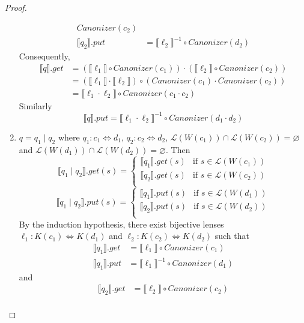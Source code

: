 \documentclass{svproc}
\newcommand{\sep}{\ensuremath{\; | \;}}
\newcommand{\canonizer}{\ensuremath{\mathit{Canonizer}}}
\begin{document}
\begin{proof}
\begin{enumerate}
\begin{align*}
\canonizer(c_2)\\
\llbracket q_2 \rrbracket.put &= {\llbracket \ell_2 \rrbracket}^{-1} \circ
\canonizer(d_2)
\end{align*}
Consequently,
\begin{align*}
  \llbracket q \rrbracket.get &= (\llbracket \ell_1 \rrbracket \circ
\canonizer(c_1)) \cdot  (\llbracket \ell_2 \rrbracket \circ
\canonizer(c_2))\\
&= (\llbracket \ell_1 \rrbracket \cdot \llbracket \ell_2
\rrbracket) \circ (\canonizer(c_1) \cdot \canonizer(c_2))\\
&= \llbracket \ell_1 \cdot  \ell_2 \rrbracket \circ \canonizer(c_1 \cdot c_2)
\end{align*}
Similarly
$$
  \llbracket q \rrbracket.put = \llbracket \ell_1 \cdot  \ell_2 \rrbracket^{-1}
  \circ \canonizer(d_1 \cdot d_2) $$
  \item
  $q = q_1 \sep q_2$ where $q_1 : c_1 \Leftrightarrow d_1 $, $q_2 : c_2
  \Leftrightarrow d_2$, $\mathcal{L}(W(c_1)) \cap \mathcal{L}(W(c_2)) =
  \varnothing$ and $\mathcal{L}(W(d_1)) \cap \mathcal{L}(W(d_2)) = \varnothing$.
  Then
  $$
  \llbracket q_1 \sep q_2 \rrbracket.get(s) = 
  \begin{cases}
  \llbracket q_1 \rrbracket.get (s) & \text{if } s \in \mathcal{L}(W(c_1))\\
  \llbracket q_2 \rrbracket.get (s) & \text{if } s \in \mathcal{L}(W(c_2))\\
  \end{cases}$$
  $$\llbracket q_1 \sep q_2 \rrbracket.put(s) = 
  \begin{cases}
  \llbracket q_1 \rrbracket.put (s) & \text{if } s \in \mathcal{L}(W(d_1))\\
  \llbracket q_2 \rrbracket.put (s) & \text{if } s \in \mathcal{L}(W(d_2))\\
  \end{cases}
  $$
By the induction hypothesis, there exist bijective lenses $\ell_1 : K(c_1)
\Leftrightarrow K(d_1)$ and $\ell_2 : K(c_2) \Leftrightarrow K(d_2)$ such that
\begin{align*}
\llbracket q_1 \rrbracket.get &= \llbracket \ell_1 \rrbracket \circ
\canonizer(c_1)\\
\llbracket q_1 \rrbracket.put &= {\llbracket \ell_1 \rrbracket}^{-1} \circ
\canonizer(d_1)
\end{align*}
and
\begin{align*}
\llbracket q_2 \rrbracket.get &= \llbracket \ell_2 \rrbracket \circ
\canonizer(c_2)\\

\end{align*}
\end{enumerate}
\end{proof}
\end{document}
